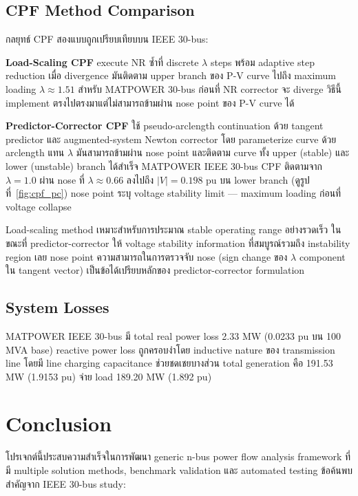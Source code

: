 \documentclass[12pt,a4paper]{article}
\begin{document}
\subsection{CPF Method Comparison}

กลยุทธ์ CPF สองแบบถูกเปรียบเทียบบน IEEE 30-bus:

\textbf{Load-Scaling CPF} execute NR ซ้ำที่ discrete $\lambda$ steps พร้อม adaptive step reduction เมื่อ divergence มันติดตาม upper branch ของ P-V curve ไปถึง maximum loading $\lambda \approx 1.51$ สำหรับ MATPOWER 30-bus ก่อนที่ NR corrector จะ diverge วิธีนี้ implement ตรงไปตรงมาแต่ไม่สามารถข้ามผ่าน nose point ของ P-V curve ได้

\textbf{Predictor-Corrector CPF} ใช้ pseudo-arclength continuation ด้วย tangent predictor และ augmented-system Newton corrector โดย parameterize curve ด้วย arclength แทน $\lambda$ มันสามารถข้ามผ่าน nose point และติดตาม curve ทั้ง upper (stable) และ lower (unstable) branch ได้สำเร็จ MATPOWER IEEE 30-bus CPF ติดตามจาก $\lambda = 1.0$ ผ่าน nose ที่ $\lambda \approx 0.66$ ลงไปถึง $|V| = 0.198$ pu บน lower branch (ดูรูปที่~\ref{fig:cpf_pc}) nose point ระบุ voltage stability limit — maximum loading ก่อนที่ voltage collapse

Load-scaling method เหมาะสำหรับการประมาณ stable operating range อย่างรวดเร็ว ในขณะที่ predictor-corrector ให้ voltage stability information ที่สมบูรณ์รวมถึง instability region เลย nose point ความสามารถในการตรวจจับ nose (sign change ของ $\lambda$ component ใน tangent vector) เป็นข้อได้เปรียบหลักของ predictor-corrector formulation

\subsection{System Losses}

MATPOWER IEEE 30-bus มี total real power loss 2.33 MW (0.0233 pu บน 100 MVA base) reactive power loss ถูกครอบงำโดย inductive nature ของ transmission line โดยมี line charging capacitance ช่วยชดเชยบางส่วน total generation คือ 191.53 MW (1.9153 pu) จ่าย load 189.20 MW (1.892 pu)

\section{Conclusion}

โปรเจกต์นี้ประสบความสำเร็จในการพัฒนา generic n-bus power flow analysis framework ที่มี multiple solution methods, benchmark validation และ automated testing ข้อค้นพบสำคัญจาก IEEE 30-bus study:
\end{document}
